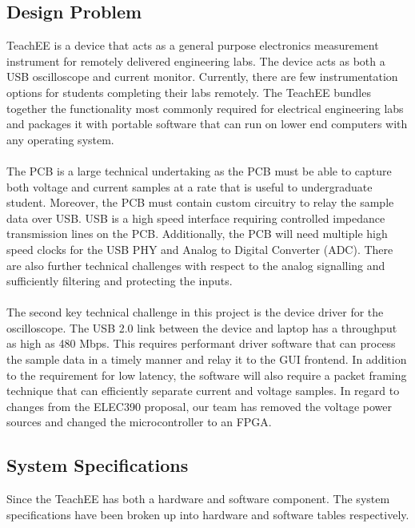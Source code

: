 \documentclass[letterpaper,12pt]{article}
\begin{document}
\subsection{Design Problem}
TeachEE is a device that acts as a general purpose electronics measurement
instrument for remotely delivered engineering labs. The device acts as both a
USB oscilloscope and current monitor. Currently, there are few instrumentation
options for students completing their labs remotely. The TeachEE bundles
together the functionality most commonly required for electrical engineering
labs and packages it with portable software that can run on lower end computers
with any operating system.
\\~\\
The PCB is a large technical undertaking as the PCB must be able to capture both
voltage and current samples at a rate that is useful to undergraduate student.
Moreover, the PCB must contain custom circuitry to relay the sample data over
USB. USB is a high speed interface requiring controlled impedance transmission
lines on the PCB. Additionally, the PCB will need multiple high speed clocks for
the USB PHY and Analog to Digital Converter (ADC). There are also further
technical challenges with respect to the analog signalling and sufficiently
filtering and protecting the inputs.
\\~\\
The second key technical challenge in this project is the device driver for the
oscilloscope. The USB 2.0 link between the device and laptop has a throughput as
high as 480 Mbps. This requires performant driver software that can process the
sample data in a timely manner and relay it to the GUI frontend. In addition to
the requirement for low latency, the software will also require a packet framing
technique that can efficiently separate current and voltage samples. In regard
to changes from the ELEC390 proposal, our team has removed the voltage power
sources and changed the microcontroller to an FPGA.
\subsection{System Specifications}
Since the TeachEE has both a hardware and software component. The system
specifications have been broken up into hardware and software tables
respectively.
\end{document}
